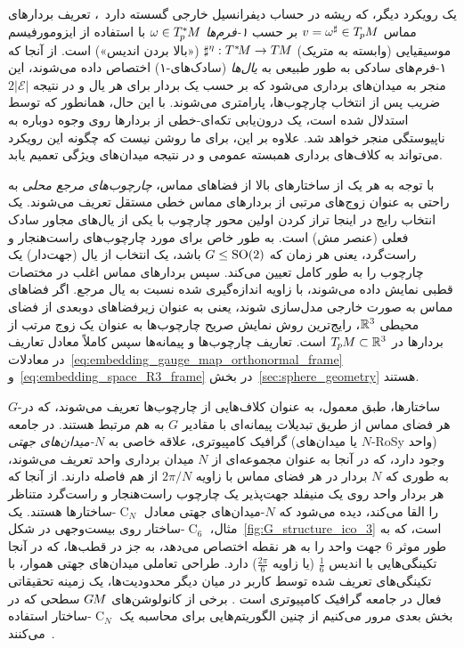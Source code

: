 یک رویکرد دیگر، که ریشه در حساب دیفرانسیل خارجی گسسته دارد~\cite{desbrun2005DiscreteExteriorCalculus,elcott2005building}، تعریف بردارهای مماس $v = \omega^\sharp \in T_{\mkern-1.5mu p}\mkern-.5muM$ بر حسب \emph{۱-فرم‌ها} $\omega \in T_{\mkern-1.5mu p}^{\mkern-0mu *}\mkern-1muM$ با استفاده از ایزومورفیسم موسیقیایی (وابسته به متریک) $\sharp^\eta: T^{\mkern0.5mu *}\mkern-3.5muM \to T\mkern-1.5muM$ («بالا بردن اندیس») است.
از آنجا که ۱-فرم‌های سادکی به طور طبیعی به \emph{یال‌ها} (سادک‌های-۱) اختصاص داده می‌شوند، این منجر به میدان‌های برداری می‌شود که بر حسب یک بردار برای هر یال و در نتیجه $2|\mathcal{E}|$ ضریب پس از انتخاب چارچوب‌ها، پارامتری می‌شوند.
با این حال، همانطور که توسط \citet{deGoes2016VectorFieldProcessing} استدلال شده است، یک درون‌یابی تکه‌ای-خطی از بردارها روی وجوه دوباره به ناپیوستگی منجر خواهد شد.
علاوه بر این، برای ما روشن نیست که چگونه این رویکرد می‌تواند به کلاف‌های برداری همبسته عمومی و در نتیجه میدان‌های ویژگی تعمیم یابد.







با توجه به هر یک از ساختارهای بالا از فضاهای مماس، \emph{چارچوب‌های مرجع محلی} به راحتی به عنوان زوج‌های مرتبی از بردارهای مماس خطی مستقل تعریف می‌شوند.
یک انتخاب رایج در اینجا تراز کردن اولین محور چارچوب با یکی از یال‌های مجاور سادک فعلی (عنصر مش) است.
به طور خاص برای مورد چارچوب‌های راست‌هنجار و راست‌گرد، یعنی هر زمان که $G\leq\operatorname{SO}(2)$ باشد، یک انتخاب از یال (جهت‌دار) یک چارچوب را به طور کامل تعیین می‌کند.
سپس بردارهای مماس اغلب در مختصات قطبی نمایش داده می‌شوند، با زاویه اندازه‌گیری شده نسبت به یال مرجع.
اگر فضاهای مماس به صورت خارجی مدل‌سازی شوند، یعنی به عنوان زیرفضاهای دوبعدی از فضای محیطی $\mathbb{R}^3$، رایج‌ترین روش نمایش صریح چارچوب‌ها به عنوان یک زوج مرتب از بردارها در $T_{\mkern-1.5mu p}\mkern-.5muM \subset \mathbb{R}^3$ است.
تعاریف چارچوب‌ها و پیمانه‌ها سپس کاملاً معادل تعاریف در
معادلات~\eqref{eq:embedding_gauge_map_orthonormal_frame} و~\eqref{eq:embedding_space_R3_frame}
در بخش~\ref{sec:sphere_geometry} هستند.

$G$-ساختارها، طبق معمول، به عنوان کلاف‌هایی از چارچوب‌ها تعریف می‌شوند، که در هر فضای مماس از طریق تبدیلات پیمانه‌ای با مقادیر $G$ به هم مرتبط هستند.
در جامعه گرافیک کامپیوتری، علاقه خاصی به \emph{$N$-میدان‌های جهتی} (یا میدان‌های $N$-RoSy واحد) وجود دارد، که در آنجا به عنوان مجموعه‌ای از $N$ میدان برداری واحد تعریف می‌شوند، به طوری که $N$ بردار در هر فضای مماس با زاویه $2\pi/N$ از هم فاصله دارند.
از آنجا که هر بردار واحد روی یک منیفلد جهت‌پذیر یک چارچوب راست‌هنجار و راست‌گرد متناظر را القا می‌کند، دیده می‌شود که $N$-میدان‌های جهتی معادل $\operatorname{C}_N$-ساختارها هستند.
یک مثال، $\operatorname{C}_6$-ساختار روی بیست‌وجهی در شکل~\ref{fig:G_structure_ico_3} است، که به طور موثر $6$ جهت واحد را به هر نقطه اختصاص می‌دهد، به جز در قطب‌ها، که در آنجا تکینگی‌هایی با اندیس $\frac{1}{6}$ (یا زاویه $\frac{2\pi}{6}$) دارد.
طراحی تعاملی میدان‌های جهتی هموار، با تکینگی‌های تعریف شده توسط کاربر در میان دیگر محدودیت‌ها، یک زمینه تحقیقاتی فعال در جامعه گرافیک کامپیوتری است
\cite{li2006representing,ray2008nSymmDirectionField,lai2009metric,craneTrivialConnectionsDiscrete2010,Knoppel:2013:GOD,liu2016discreteConnection,Sharp2019VectorHeatMethod}.
برخی از کانولوشن‌های $G\mkern-1.4muM$ سطحی که در بخش بعدی مرور می‌کنیم از چنین الگوریتم‌هایی برای محاسبه یک $\operatorname{C}_N$-ساختار استفاده می‌کنند~\cite{huang2019texturenet,Yang2020parallelFrameCNN}.



